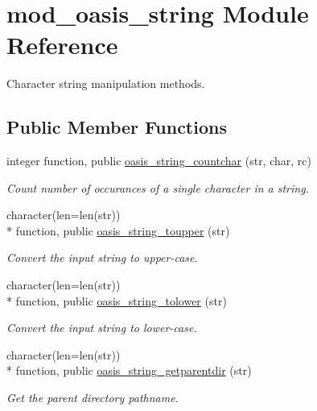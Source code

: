 \hypertarget{classmod__oasis__string}{\section{mod\+\_\+oasis\+\_\+string Module Reference}
\label{classmod__oasis__string}
}


Character string manipulation methods.  


\subsection*{Public Member Functions}
\begin{DoxyCompactItemize}
\item 
integer function, public \hyperlink{classmod__oasis__string_a54c5d197eba9bcb7fa7f71b200f8e5e6}{oasis\+\_\+string\+\_\+countchar} (str, char, rc)
\begin{DoxyCompactList}\small\item\em Count number of occurances of a single character in a string. \end{DoxyCompactList}\item 
character(len=len(str)) \\*
function, public \hyperlink{classmod__oasis__string_a832ff1d26d766bee361ef9669efacda6}{oasis\+\_\+string\+\_\+toupper} (str)
\begin{DoxyCompactList}\small\item\em Convert the input string to upper-\/case. \end{DoxyCompactList}\item 
character(len=len(str)) \\*
function, public \hyperlink{classmod__oasis__string_af339c54c982092a80960a5241ccae1fa}{oasis\+\_\+string\+\_\+tolower} (str)
\begin{DoxyCompactList}\small\item\em Convert the input string to lower-\/case. \end{DoxyCompactList}\item 
character(len=len(str)) \\*
function, public \hyperlink{classmod__oasis__string_a8f2289f6a9d1e9940204bbeb82b89f33}{oasis\+\_\+string\+\_\+getparentdir} (str)
\begin{DoxyCompactList}\small\item\em Get the parent directory pathname. \end{DoxyCompactList}\item 

\end{DoxyCompactItemize}
